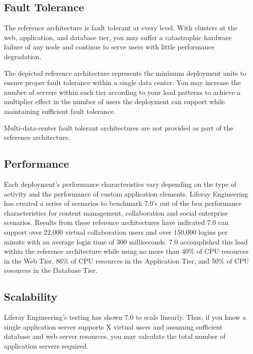 \subsection{Fault Tolerance}\label{fault-tolerance}

The reference architecture is fault tolerant at every level. With
clusters at the web, application, and database tier, you may suffer a
catastrophic hardware failure of any node and continue to serve users
with little performance degradation.

The depicted reference architecture represents the minimum deployment
units to ensure proper fault tolerance within a single data center. You
may increase the number of servers within each tier according to your
load patterns to achieve a multiplier effect in the number of users the
deployment can support while maintaining sufficient fault tolerance.

Multi-data-center fault tolerant architectures are not provided as part
of the reference architecture.

\subsection{Performance}\label{performance}

Each deployment's performance characteristics vary depending on the type
of activity and the performance of custom application elements. Liferay
Engineering has created a series of scenarios to benchmark 7.0's out of
the box performance characteristics for content management,
collaboration and social enterprise scenarios. Results from these
reference architectures have indicated 7.0 can support over 22,000
virtual collaboration users and over 150,000 logins per minute with an
average login time of 300 milliseconds. 7.0 accomplished this load
within the reference architecture while using no more than 40\% of CPU
resources in the Web Tier, 86\% of CPU resources in the Application
Tier, and 50\% of CPU resources in the Database Tier.

\subsection{Scalability}\label{scalability}

Liferay Engineering's testing has shown 7.0 to scale linearly. Thus, if
you know a single application server supports X virtual users and
assuming sufficient database and web server resources, you may calculate
the total number of application servers required.

